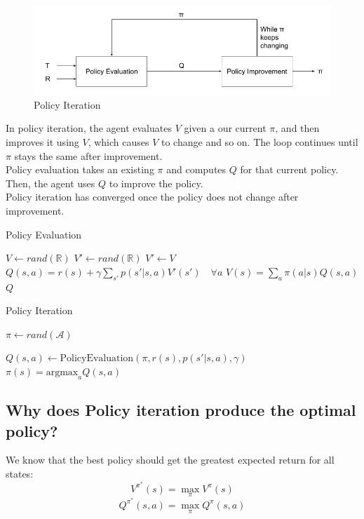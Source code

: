 \documentclass[11pt]{article}
\begin{document}
\begin{figure}[H]
    \centering
    \includegraphics[width=0.8\linewidth]{Policy iteration.png}
    \caption{Policy Iteration}
    \label{fig:my_label}
\end{figure}

In policy iteration, the agent evaluates $V$ given a our current $\pi$, and then improves it using $V$, which causes $V$ to change and so on. The loop continues until $\pi$ stays the same after improvement.\\
Policy evaluation takes an existing $\pi$ and computes $Q$ for that current policy.
Then, the agent uses $Q$ to improve the policy.\\
Policy iteration has converged once the policy does not change after improvement.

\begin{algorithm}
\caption{Policy Evaluation}\label{alg:cap}
\begin{algorithmic}[1]
\STATE $V \gets rand(\mathbb{R})$
\STATE $V' \gets rand(\mathbb{R})$
    \STATE $V' \gets V$
        \STATE $Q(s,a) = r(s) + \gamma \sum\limits_{s'} p(s'|s,a)V'(s') \quad \forall a$
        \STATE $V(s) = \sum\limits_a \pi(a|s)Q(s,a)$
    \ENDFOR
\ENDWHILE
\RETURN $Q$
\end{algorithmic}
\end{algorithm}

\begin{algorithm}
\caption{Policy Iteration}
\label{algo:policy}
\begin{algorithmic}[1]
\STATE $\pi \gets rand(\mathcal{A})$

\STATE $Q(s,a) \gets \text{PolicyEvaluation}(\pi, r(s), p(s'|s,a), \gamma)$
    \STATE $\pi(s) = \text{argmax}_a Q(s,a)$
\ENDFOR
\ENDWHILE
\end{algorithmic}
\end{algorithm}

\subsection{Why does Policy iteration produce the optimal policy?}
We know that the best policy should get the greatest expected return for all states: \\
$$ V^{\pi^*}(s) = \max_\pi V^\pi(s)$$ 
$$ Q^{\pi^*}(s,a) = \max_\pi Q^\pi(s,a)$$ 
\end{document}
